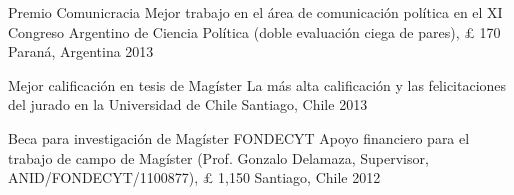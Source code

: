 \vspace{1mm}

\begin{cvhonors}
\cvhonor
{Premio Comunicracia}
{Mejor trabajo en el área de comunicación política en el XI Congreso Argentino de Ciencia Política (doble evaluación ciega de pares), {\pounds} 170}
{Paraná, Argentina}
{2013}
\end{cvhonors}

\vspace{1mm}

\begin{cvhonors}
\cvhonor
{Mejor calificación en tesis de Magíster}
{La más alta calificación y las felicitaciones del jurado en la Universidad de Chile}
{Santiago, Chile}
{2013}
\end{cvhonors}

\vspace{1mm}

\begin{cvhonors}
\cvhonor
{Beca para investigación de Mag\'ister FONDECYT}
{Apoyo financiero para el trabajo de campo de Magíster (Prof. Gonzalo Delamaza, Supervisor, ANID/FONDECYT/1100877), {\pounds} 1,150}
{Santiago, Chile}
{2012}
\end{cvhonors}

\vspace{1mm}
